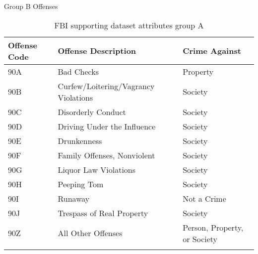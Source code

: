 Group B Offenses
\begin{center}
\begin{longtable}{|m{8em} m{16em} m{7em}|}
    \hline
    Offense Code & 
    Offense Description & 
    Crime Against\\
    \hline
    90A & 
    Bad Checks & 
    Property\\
    \hline
    90B & 
    Curfew/Loitering/Vagrancy Violations & 
    Society\\
    \hline
    90C & 
    Disorderly Conduct & 
    Society\\
    \hline
    90D & 
    Driving Under the Influence & 
    Society\\
    \hline
    90E & 
    Drunkenness & 
    Society\\
    \hline
    90F & 
    Family Offenses, Nonviolent & 
    Society\\
    \hline
    90G & 
    Liquor Law Violations & 
    Society\\
    \hline
    90H & 
    Peeping Tom & 
    Society\\
    \hline
    90I & 
    Runaway & 
    Not a Crime\\
    \hline
    90J & 
    Trespass of Real Property & 
    Society\\
    \hline
    90Z & 
    All Other Offenses & 
    Person, Property, or Society\\
    \hline
\caption{FBI supporting dataset attributes group A}
\end{longtable}
\end{center}